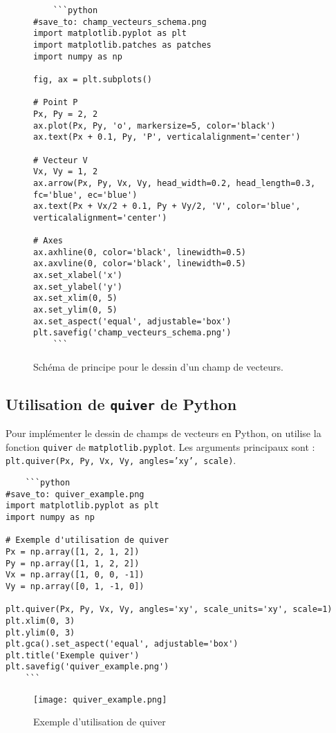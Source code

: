\documentclass{article}
\begin{document}
\begin{figure}[H]
    \centering
    \begin{verbatim}
    ```python
#save_to: champ_vecteurs_schema.png
import matplotlib.pyplot as plt
import matplotlib.patches as patches
import numpy as np

fig, ax = plt.subplots()

# Point P
Px, Py = 2, 2
ax.plot(Px, Py, 'o', markersize=5, color='black')
ax.text(Px + 0.1, Py, 'P', verticalalignment='center')

# Vecteur V
Vx, Vy = 1, 2
ax.arrow(Px, Py, Vx, Vy, head_width=0.2, head_length=0.3, fc='blue', ec='blue')
ax.text(Px + Vx/2 + 0.1, Py + Vy/2, 'V', color='blue', verticalalignment='center')

# Axes
ax.axhline(0, color='black', linewidth=0.5)
ax.axvline(0, color='black', linewidth=0.5)
ax.set_xlabel('x')
ax.set_ylabel('y')
ax.set_xlim(0, 5)
ax.set_ylim(0, 5)
ax.set_aspect('equal', adjustable='box')
plt.savefig('champ_vecteurs_schema.png')
    ```
    \end{verbatim}
    \caption{Schéma de principe pour le dessin d'un champ de vecteurs.}
    \label{fig:champ_vecteurs_schema}
\end{figure}

\subsection{Utilisation de \texttt{quiver} de Python}

Pour implémenter le dessin de champs de vecteurs en Python, on utilise la fonction \texttt{quiver} de \texttt{matplotlib.pyplot}. Les arguments principaux sont : \texttt{plt.quiver(Px, Py, Vx, Vy, angles='xy', scale)}.

\begin{verbatim}
    ```python
#save_to: quiver_example.png
import matplotlib.pyplot as plt
import numpy as np

# Exemple d'utilisation de quiver
Px = np.array([1, 2, 1, 2])
Py = np.array([1, 1, 2, 2])
Vx = np.array([1, 0, 0, -1])
Vy = np.array([0, 1, -1, 0])

plt.quiver(Px, Py, Vx, Vy, angles='xy', scale_units='xy', scale=1)
plt.xlim(0, 3)
plt.ylim(0, 3)
plt.gca().set_aspect('equal', adjustable='box')
plt.title('Exemple quiver')
plt.savefig('quiver_example.png')
    ```
\end{verbatim}

\begin{figure}[H]
    \centering
    \texttt{[image: quiver\_example.png]}
    \caption{Exemple d'utilisation de quiver}
    \label{fig:quiver_example}
\end{figure}
\end{document}
